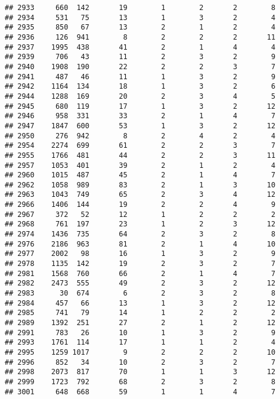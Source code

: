\documentclass[]{article}
\begin{document}
\begin{verbatim}
## 2933     660  142       19        1        2       2        8
## 2934     531   75       13        1        3       2        4
## 2935     850   67       13        2        1       2        4
## 2936     126  941        8        2        2       2       11
## 2937    1995  438       41        2        1       4        4
## 2939     706   43       11        2        3       2        9
## 2940    1908  190       22        2        2       3        7
## 2941     487   46       11        1        3       2        9
## 2942    1164  134       18        1        3       2        6
## 2944    1288  169       20        2        3       4        5
## 2945     680  119       17        1        3       2       12
## 2946     958  331       33        2        1       4        7
## 2947    1847  600       53        1        3       2       12
## 2950     276  942        8        2        4       2        4
## 2954    2274  699       61        2        2       3        7
## 2955    1766  481       44        2        2       3       11
## 2957    1053  401       39        2        1       2        4
## 2960    1015  487       45        2        1       4        7
## 2962    1058  989       83        2        1       3       10
## 2963    1043  749       65        2        3       4       12
## 2966    1406  144       19        2        2       4        9
## 2967     372   52       12        1        2       2        2
## 2968     761  197       23        1        2       3       12
## 2974    1436  735       64        2        3       2        8
## 2976    2186  963       81        2        1       4       10
## 2977    2002   98       16        1        3       2        9
## 2978    1135  142       19        2        3       2        7
## 2981    1568  760       66        2        1       4        7
## 2982    2473  555       49        2        3       2       12
## 2983      30  674        6        2        3       2        8
## 2984     457   66       13        1        3       2       12
## 2985     741   79       14        1        2       2        2
## 2989    1392  251       27        2        1       2       12
## 2991     783   26       10        1        3       2        9
## 2993    1761  114       17        1        1       2        4
## 2995    1259 1017        9        2        2       2       10
## 2996     852   34       10        2        3       2        7
## 2998    2073  817       70        1        1       3       12
## 2999    1723  792       68        2        3       2        8
## 3001     648  668       59        1        1       4        7

\end{verbatim}
\end{document}

